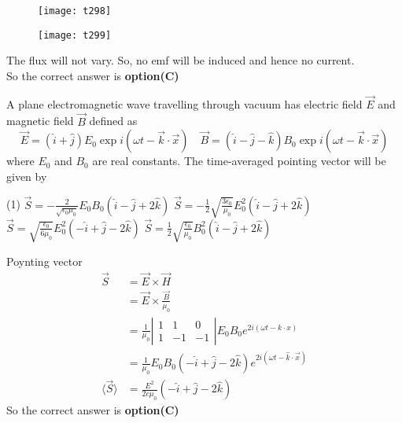 \begin{questions}
\begin{tasks}
\begin{figure}[H]
	\end{figure}
	\task[\textbf{C.}] \begin{figure}[H]
		\centering
		\texttt{[image: t298]}
	\end{figure}
	\task[\textbf{D.}] \begin{figure}[H]
		\centering
		\texttt{[image: t299]}
	\end{figure}
\end{tasks}
\begin{answer}
	The flux will not vary. So, no emf will be induced and hence no current.\\
	So the correct answer is \textbf{option(C)}
\end{answer}
\begin{minipage}{\textwidth}
	\question A plane electromagnetic wave travelling through vacuum has electric field $\vec{E}$ and magnetic field $\vec{B}$ defined as
	$$
	\vec{E}=(\hat{i}+\hat{j}) E_{0} \exp i(\omega t-\vec{k} \cdot \vec{x}) \quad \vec{B}=(\hat{i}-\hat{j}-\hat{k}) B_{0} \exp i(\omega t-\vec{k} \cdot \vec{x})
	$$
	where $E_{0}$ and $B_{0}$ are real constants. The time-averaged pointing vector will be given by
\end{minipage}
\begin{tasks}(1)
	\task[\textbf{A.}]   $\vec{S}=-\frac{2}{\sqrt{\epsilon_{0} \mu_{0}}} E_{0} B_{0}(\hat{i}-\hat{j}+2 \hat{k})$
	\task[\textbf{B.}] $\vec{S}=-\frac{1}{2} \sqrt{\frac{3 \epsilon_{0}}{\mu_{0}}} E_{0}^{2}(\hat{i}-\hat{j}+2 \hat{k})$
	\task[\textbf{C.}] $\vec{S}=\sqrt{\frac{\epsilon_{0}}{6 \mu_{0}}} E_{0}^{2}(-\hat{i}+\hat{j}-2 \hat{k})$
	\task[\textbf{D.}] $\vec{S}=\frac{1}{2} \sqrt{\frac{\epsilon_{0}}{\mu_{0}}} B_{0}^{2}(\hat{i}-\hat{j}+2 \hat{k})$
\end{tasks}
\begin{answer}
	Poynting vector
	$$
	\begin{aligned}
	\vec{S} &=\vec{E} \times \vec{H} \\
	&=\vec{E} \times \frac{\vec{B}}{\mu_{0}} \\
	&=\frac{1}{\mu_{0}}\left|\begin{array}{rrr}
	1 & 1 & 0 \\
	1 & -1 & -1
	\end{array}\right| E_{0} B_{0} e^{2 i(\omega t-k \cdot x)} \\
	&=\frac{1}{\mu_{0}} E_{0} B_{0}(-\hat{i}+\hat{j}-2 \hat{k}) e^{2 i(\omega t-\hat{k} \cdot \vec{x})} \\
	\langle\vec{S}\rangle &=\frac{E^{2}}{2 c \mu_{0}}(-\hat{i}+\hat{j}-2 \hat{k})
	\end{aligned}
	$$
	So the correct answer is \textbf{option(C)}
\end{answer}


\end{questions}
